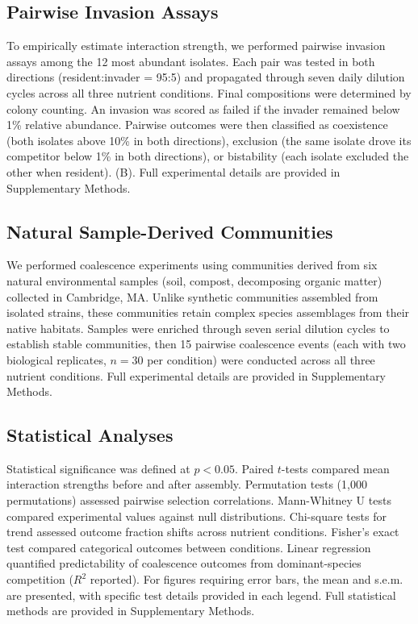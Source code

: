 \subsection*{Pairwise Invasion Assays}
\label{sec:methods:invasion}

To empirically estimate interaction strength, we performed pairwise invasion assays among the 12 most abundant isolates. Each pair was tested in both directions (resident:invader = 95:5) and propagated through seven daily dilution cycles across all three nutrient conditions. Final compositions were determined by colony counting. An invasion was scored as failed if the invader remained below 1\% relative abundance. Pairwise outcomes were then classified as coexistence (both isolates above 10\% in both directions), exclusion (the same isolate drove its competitor below 1\% in both directions), or bistability (each isolate excluded the other when resident).  (B). Full experimental details are provided in Supplementary Methods.



\subsection*{Natural Sample-Derived Communities}
\label{sec:methods:natural}

We performed coalescence experiments using communities derived from six natural environmental samples (soil, compost, decomposing organic matter) collected in Cambridge, MA. Unlike synthetic communities assembled from isolated strains, these communities retain complex species assemblages from their native habitats. Samples were enriched through seven serial dilution cycles to establish stable communities, then 15 pairwise coalescence events (each with two biological replicates, $n = 30$ per condition) were conducted across all three nutrient conditions. Full experimental details are provided in Supplementary Methods.


\subsection*{Statistical Analyses}
\label{sec:methods:statistics}

Statistical significance was defined at $p < 0.05$. Paired $t$-tests compared mean interaction strengths before and after assembly. Permutation tests (1,000 permutations) assessed pairwise selection correlations. Mann-Whitney U tests compared experimental values against null distributions. Chi-square tests for trend assessed outcome fraction shifts across nutrient conditions. Fisher's exact test compared categorical outcomes between conditions. Linear regression quantified predictability of coalescence outcomes from dominant-species competition ($R^2$ reported). For figures requiring error bars, the mean and s.e.m. are presented, with specific test details provided in each legend. Full statistical methods are provided in Supplementary Methods.


